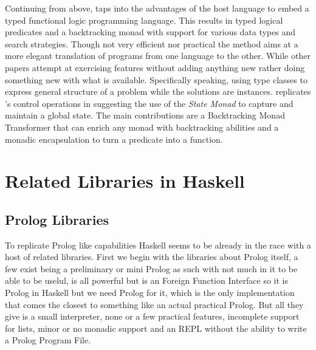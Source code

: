 \documentclass[thesis-solanki.tex]{subfiles}
\begin{document}
  Continuing from above, \cite{claessen2000typed} taps into the advantages of the host language to embed a typed
  functional logic programming language.
  This results in typed logical predicates and a backtracking monad with support for various data types and search
  strategies.
  Though not very efficient nor practical the method aims at a more elegant translation of programs from one
  language to the other.
  While other papers \cite{erwig2004escape} attempt at exercising  features without adding
  anything new rather doing something new with what is available.
  Specifically speaking, using  type classes to express general structure of a problem while the
  solutions are instances.
  \cite{hinze1998prological} replicates 's control operations in  suggesting the
  use of the  \textit{State Monad} to capture and maintain a global state.
  The main contributions are a Backtracking Monad Transformer that can enrich any monad with backtracking abilities
  and a monadic encapsulation to turn a  predicate into a  function.



\section{Related Libraries in Haskell}
\subsection{Prolog Libraries}

  To replicate Prolog like
  capabilities Haskell seems to be already in the race
  with a host of related libraries.
  First we begin with the libraries about Prolog itself, a few exist \cite{nanoprolog-lib} being a preliminary or
  mini Prolog as such with not much in it to be able to be uselul, \cite{hswip-lib} is all
  powerful but is an Foreign Function Interface so it is Prolog in Haskell but we need Prolog
  for it, \cite{prolog-lib} which is the only implementation that comes the closest to something like an actual
  practical Prolog.
  But all they give is a small interpreter, none or a few practical features, incomplete support for lists, minor
  or no monadic support and an REPL without the ability to write a Prolog Program File.
\end{document}
